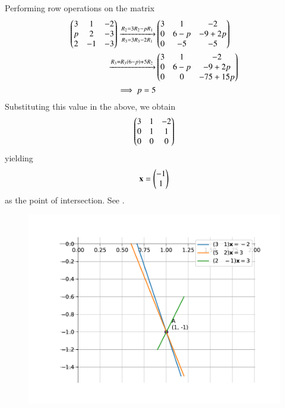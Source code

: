 Performing row operations
on the matrix
\begin{align*}  
\myvec{
    3 &1&-2 \\
     p&2&-3\\
     2&-1&-3
}
\xrightarrow[R_3=3R_3-2R_1]{R_2=3R_2-pR_1}&\myvec{
    3&1&-2\\
     $0$&6-p&-9+2p\\
     0&-5&-5}\\
 \xrightarrow{R_3=R_3(6-p)+5R_2}&\myvec{
    3&1&-2\\
     0&6-p&-9+2p\\
     0&0&-75+15p}
     \\
  \implies 
    p=5
\end{align*}
Substituting this value in the above, we obtain
\begin{align}
\begin{pmatrix}
    3&1&-2\\
     0&1&1\\
     0&0&0\end{pmatrix}
\end{align}
yielding
\begin{align}
	\mathbf{x} = \begin{pmatrix}-1 \\ 1\end{pmatrix}
\end{align}
as the point of intersection.
    See .
\begin{figure}[H]
    \centering
    \includegraphics[width=0.75\columnwidth]{chapters/11/10/4/9/figs/fig.pdf}
    \caption{}
    \label{fig:11.10.4.9}
\end{figure}

